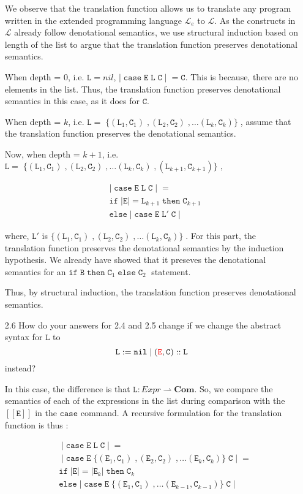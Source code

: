 \documentclass[a4paper,10pt]{article}
\newcommand{\E}{\mathtt{E}}
\newcommand{\B}{\mathtt{B}}
\newcommand{\C}{\mathtt{C}}
\newcommand{\LL}{\mathtt{L}}
\newcommand{\ifsym}{\mathtt{if}}
\newcommand{\then}{\mathtt{then}}
\newcommand{\elsesym}{\mathtt{else}}
\newcommand{\nil}{\mathtt{nil}}
\newcommand{\case}{\mathtt{case}}
\newcommand{\denot}[1]{\mathtt{[[{#1}]]}}
\newcommand{\question}[1]
{\color{DarkBlue}#1 \color{Black} \newline}
\begin{document}
\begin{enumerate}
We observe that the translation function allows us to translate any program
written in the extended programming language $\mathcal{L}_e$ to $\mathcal{L}$.
As the constructs in $\mathcal{L}$ already follow denotational semantics, we
use structural induction based on length of the list to argue that the
translation function preserves denotational semantics.

\proof
When depth = $0$, i.e. $\LL = nil$, $| \; \case \; \E \; \LL \; \C \; |\; = \C
$. This is because, there are no elements in the list. Thus, the 
translation function preserves denotational semantics in this case, as it does
for $\C$.

When depth = $k$, i.e. $\LL = \; \{ (\LL_{1}, \C_{1}) \; , (\LL_{2}, \C_{2}) \;, \ldots
(\LL_{k}, \C_{k}) \} \;$, assume that the translation function preserves the
denotational semantics.

Now, when depth = $k+1$, i.e. $\LL = \; \{ (\LL_{1}, \C_{1}) \; , (\LL_{2},
\C_{2}) \;, \ldots (\LL_{k}, \C_{k}) \;, (\LL_{k+1}, \C_{k+1}) \} \;,$ 

\begin{align*}
& | \; \case \; \E \; \LL \; \C \; |\; = \\
& \ifsym \; |\E| = \LL_{k+1} \; \then \; \C_{k+1} \\
& \elsesym \; | \; \case \; \E \; \LL' \; \C \; |\; 
\end{align*} 

where, $\LL'$  is $ \{ (\LL_{1}, \C_{1}) \;, (\LL_{2}, \C_{2}) \;, \ldots
(\LL_{k}, \C_{k}) \} \;$.
For this part, the translation function preserves the denotational semantics
by the induction hypothesis.
We already have showed that it preseves the denotational semantics for
an $\ifsym \; \B \; \then \; \C_1 \; \elsesym \; \C_2 \;$ statement.

Thus, by structural induction, the translation function preserves denotational
semantics.

\question{
\item[2.6] How do your answers for 2.4 and 2.5 change if we change the abstract syntax for $\LL$ to
\[ \LL := \nil \; | \; ({\color{red} \E},\C)::\LL \]
instead?
}

In this case, the difference is that $\LL : Expr \rightharpoonup \textbf{Com} $.
So, we compare the semantics of each of the expressions in the list during
comparison with the $\denot{\E}$ in the $\case$ command.
A recursive formulation for the translation function is thus :

\begin{align*}
& \; | \; \case \; \E \; \LL \; \C \; |\; = \\
& \; | \; \case \; \E \; \{ (\E_{1}, \C_{1}) \; , (\E_{2}, \C_{2}) \;, \ldots
(\E_{k}, \C_{k}) \} \; \C \; |\; = \\
& \ifsym \; |\E| = |\E_{k}| \; \then \; \C_{k} \\
& \elsesym \;
| \; \case \; \E \; \{ (\E_{1}, \C_{1}) \;, \ldots
(\E_{k-1}, \C_{k-1}) \} \; \C \; |\;
\end{align*} 


\end{enumerate}
\end{document}
